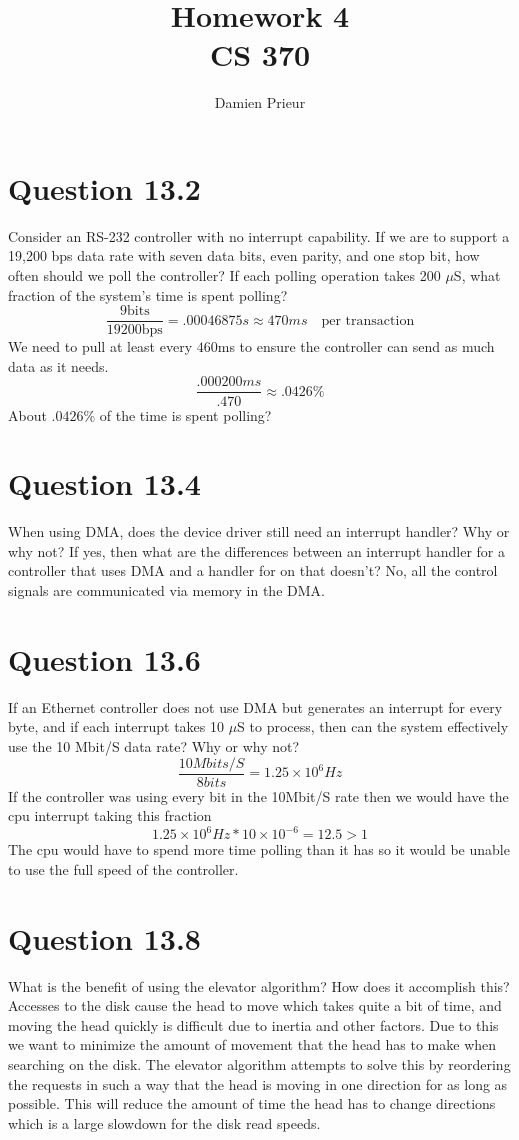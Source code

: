 \documentclass{article}
\author{Damien Prieur}
\title{Homework 4 \\ CS 370}
\date{}
\begin{document}
\maketitle

\section*{Question 13.2}
Consider an RS-232 controller with no interrupt capability.
If we are to support a 19,200 bps data rate with seven data bits, even parity, and one stop bit, how often should we poll the controller?
If each polling operation takes 200 $\mu$S, what fraction of the system's time is spent polling?
\newline
$$ \frac{9\text{bits}}{19200\text{bps}} = .00046875s \approx 470ms \quad \text{per transaction} $$
We need to pull at least every $460$ms to ensure the controller can send as much data as it needs.
$$ \frac{.000200ms}{.470} \approx .0426\text{\%} $$
About $.0426$\% of the time is spent polling?

\section*{Question 13.4}
When using DMA, does the device driver still need an interrupt handler?
Why or why not?
If yes, then what are the differences between an interrupt handler for a controller that uses DMA and a handler for on that doesn't?
\newline
No, all the control signals are communicated via memory in the DMA.

\section*{Question 13.6}
If an Ethernet controller does not use DMA but generates an interrupt for every byte, and if each interrupt takes 10 $\mu$S to process, then can the system effectively use the 10 Mbit/S data rate?
Why or why not?
\newline
$$\frac{10Mbits/S}{8bits} = 1.25\times 10^{6}Hz $$
If the controller was using every bit in the 10Mbit/S rate then we would have the cpu interrupt taking this fraction
$$1.25\times 10^{6}Hz * 10 \times 10^{-6} = 12.5 >1 $$
The cpu would have to spend more time polling than it has so it would be unable to use the full speed of the controller.

\section*{Question 13.8}
What is the benefit of using the elevator algorithm?
How does it accomplish this?
\newline
Accesses to the disk cause the head to move which takes quite a bit of time, and moving the head quickly is difficult due to inertia and other factors.
Due to this we want to minimize the amount of movement that the head has to make when searching on the disk.
The elevator algorithm attempts to solve this by reordering the requests in such a way that the head is moving in one direction for as long as possible.
This will reduce the amount of time the head has to change directions which is a large slowdown for the disk read speeds.
\end{document}
